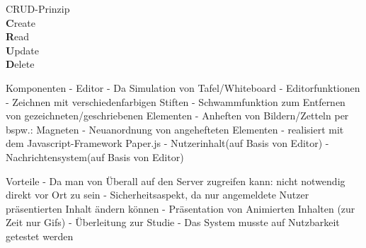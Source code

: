 \documentclass[11pt]{beamer}
\begin{document}
\begin{frame}{CRUD-Prinzip}
  \\
  \textbf{C}reate\\
  \textbf{R}ead\\
  \textbf{U}pdate\\
  \textbf{D}elete
\end{frame}

\begin{frame}{Komponenten}
      - Editor - Da Simulation von Tafel/Whiteboard
        - Editorfunktionen
          - Zeichnen mit verschiedenfarbigen Stiften
          - Schwammfunktion zum Entfernen von gezeichneten/geschriebenen Elementen
          - Anheften von Bildern/Zetteln per bspw.: Magneten
          - Neuanordnung von angehefteten Elementen
        - realisiert mit dem Javascript-Framework Paper.js
      - Nutzerinhalt(auf Basis von Editor)
      - Nachrichtensystem(auf Basis von Editor)
\end{frame}
\begin{frame}{Vorteile}
      - Da man von Überall auf den Server zugreifen kann: nicht notwendig direkt vor Ort zu sein
      - Sicherheitsaspekt, da nur angemeldete Nutzer präsentierten Inhalt ändern können
      - Präsentation von Animierten Inhalten (zur Zeit nur Gifs)
  - Überleitung zur Studie
    - Das System musste auf Nutzbarkeit getestet werden
\end{frame}
\end{document}
